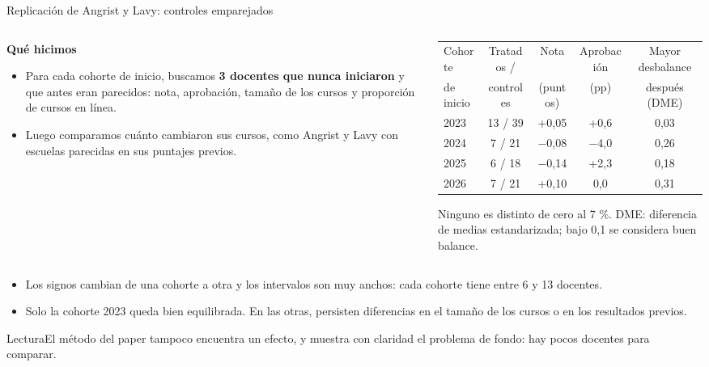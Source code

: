 \documentclass[10pt,aspectratio=169]{beamer}
\newcommand{\sintesis}[2]{%
  \begin{block}{#1}#2\end{block}}
\begin{document}
\begin{frame}{Replicación de Angrist y Lavy: controles emparejados}
  \begin{columns}[T]
    \begin{column}{0.4\textwidth}\small
      \textbf{Qué hicimos}
      \begin{itemize}
        \item Para cada cohorte de inicio, buscamos \textbf{3 docentes que nunca iniciaron} y que antes eran parecidos: nota, aprobación, tamaño de los cursos y proporción de cursos en línea.
        \item Luego comparamos cuánto cambiaron sus cursos, como Angrist y Lavy con escuelas parecidas en sus puntajes previos.
      \end{itemize}
    \end{column}
    \begin{column}{0.58\textwidth}
      \begin{table}\scriptsize
        \begin{tabular}{lcccc}
          \toprule
          Cohorte & Tratados / & Nota & Aprobación & Mayor desbalance \\
          de inicio & controles & (puntos) & (pp) & después (DME) \\
          \midrule
          2023 & 13 / 39 & +0,05 & +0,6 & 0,03 \\
          2024 & 7 / 21 & $-$0,08 & $-$4,0 & 0,26 \\
          2025 & 6 / 18 & $-$0,14 & +2,3 & 0,18 \\
          2026 & 7 / 21 & +0,10 & 0,0 & 0,31 \\
          \bottomrule
        \end{tabular}
      \end{table}
      {\scriptsize Ninguno es distinto de cero al 7 \%. DME: diferencia de medias estandarizada; bajo 0,1 se considera buen balance.}
    \end{column}
  \end{columns}
  \vspace{0.4em}
  \begin{itemize}\small
    \item Los signos cambian de una cohorte a otra y los intervalos son muy anchos: cada cohorte tiene entre 6 y 13 docentes.
    \item Solo la cohorte 2023 queda bien equilibrada. En las otras, persisten diferencias en el tamaño de los cursos o en los resultados previos.
  \end{itemize}
  \sintesis{Lectura}{El método del paper tampoco encuentra un efecto, y muestra con claridad el problema de fondo: hay pocos docentes para comparar.}
\end{frame}
\end{document}
